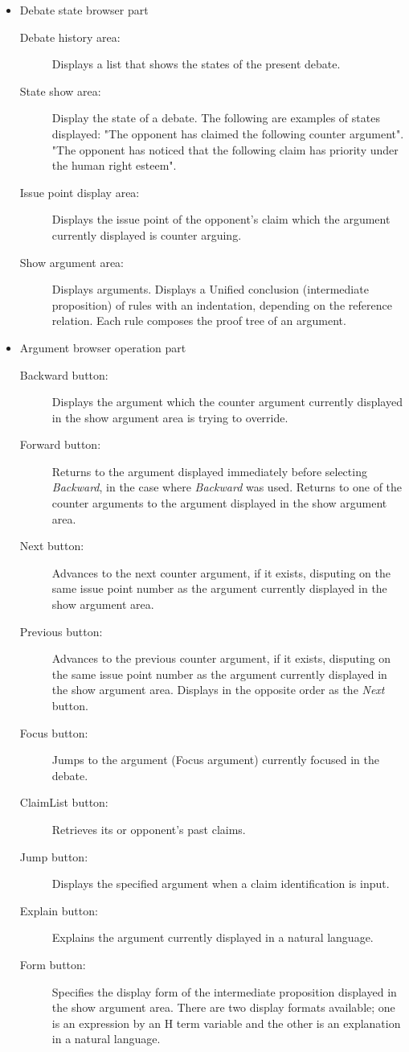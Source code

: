 \begin{itemize}
\item Debate state browser part
\begin{description}
\item[Debate history area:] Displays a list that shows the states of the present debate.
\item[State show area:] Display the state of a debate.
The following are examples of states displayed:
"The opponent has claimed the following counter argument".
"The opponent has noticed that the following claim has priority under the human right esteem".
\item[Issue point display area:] Displays the issue point of the opponent's claim which the argument currently displayed is counter arguing.
\item[Show argument area:] Displays arguments.
Displays a Unified conclusion (intermediate proposition) of rules with an indentation, depending on the reference relation.
Each rule composes the proof tree of an argument.
\end{description}

\item{Argument browser operation part}
\begin{description}
\item[Backward button:] Displays the argument which the counter argument currently displayed in the show argument area is trying to override.
\item[Forward button:] Returns to the argument displayed immediately
  before selecting {\sl Backward}, in the case where {\sl Backward} was used.
Returns to one of the counter arguments to the argument displayed in the show argument area.
\item[Next button:] Advances to the next counter argument, if it exists, disputing on the same issue point number as the argument currently displayed in the show argument area.
\item[Previous button:] Advances to the previous counter argument, if it exists, disputing on the same issue point number as the argument currently displayed in the show argument area.
Displays in the opposite order as the {\sl Next} button.
\item[Focus button:] Jumps to the argument (Focus argument) currently focused in the debate.
\item[ClaimList button:] Retrieves its or opponent's past claims.
\item[Jump button:] Displays the specified argument when a claim identification is input.
\item[Explain button:] Explains the argument currently displayed in a natural language.
\item[Form button:] Specifies the display form of the intermediate proposition displayed in the show argument area.
There are two display formats available; one is an expression by an H term variable and the other is an explanation in a natural language.
\end{description}

\end{itemize}

